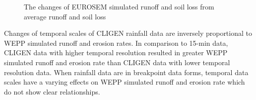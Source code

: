 \begin{figure}[htbp]
  \centering
    \qquad
  \caption{The changes of EUROSEM simulated runoff and soil loss from average
runoff and soil loss}
  \label{fig:eurosem_roff_sloss_temp_scale}
\end{figure}

Changes of temporal scales of CLIGEN rainfall data are inversely proportional
to WEPP simulated runoff and erosion rates. In comparison to 15-min data, CLIGEN
data with higher temporal resolution resulted in greater WEPP simulated runoff
and erosion rate than CLIGEN data with lower temporal resolution data.
When rainfall data are in breakpoint data forms, temporal data scales have a
varying effects on WEPP simulated runoff and erosion rate which do not show
clear relationships.

